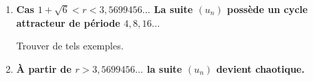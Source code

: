 \documentclass[class=report,crop=false]{standalone}
\begin{document}
\begin{tp}
\begin{enumerate}
  \begin{enumerate}
    \item Déterminer les points fixes $\ell_1$ et $\ell_2$ de $f\circ f$ qui ne sont pas des points fixes 
    de $f$.
     
    \item Montrer que $f(\ell_1) = \ell_2$ et $f(\ell_2)=\ell_1$.
     
    \item \`A l'aide du graphe de $f\circ f$, vérifier graphiquement sur un exemple, 
    que les suites $(u_{2n})$ et $(u_{2n+1})$ sont croissantes ou décroissantes à partir d'un certain rang
    et convergent, l'une vers $\ell_1$, l'autre vers $\ell_2$.
  \end{enumerate} 
  
  
  \item \textbf{Cas $1+\sqrt{6}<r<3, 5699456\ldots$ La suite $(u_n)$ possède 
  un cycle attracteur de période $4,8,16...$}
  
  Trouver de tels exemples.    
  
  \item \textbf{\`A partir de $r > 3, 5699456\ldots$ la suite $(u_n)$ devient chaotique.}
\end{enumerate}
\end{tp}


\end{document}
